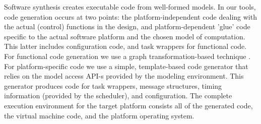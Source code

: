 
Software synthesis creates executable code from well-formed models.  In our tools, code generation occurs at two points: the platform-independent code dealing with the actual (control) functions in the design, and platform-dependent 'glue' code specific to the actual software platform and the chosen model of computation.  This latter includes configuration code, and task wrappers for functional code. For functional code generation we use a graph transformation-based technique \cite{KS:ISIS-04-505}. For platform-specific code we use a simple, template-based code generator that relies on the model access API-s provided by the modeling environment. This generator produces code for task wrappers, message structures, timing information (provided by the scheduler), and configuration. The complete execution environment for the target platform consists all of the generated code, the virtual machine code, and the platform operating system. 
